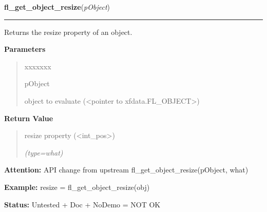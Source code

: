 \hspace{.8\funcindent}\begin{boxedminipage}{\funcwidth}

    \raggedright \textbf{fl\_get\_object\_resize}(\textit{pObject})

    \vspace{-1.5ex}

    \rule{\textwidth}{0.5\fboxrule}
\setlength{\parskip}{2ex}
    Returns the resize property of an object.

\setlength{\parskip}{1ex}
      \textbf{Parameters}
      \vspace{-1ex}

      \begin{quote}
        \begin{Ventry}{xxxxxxx}

          \item[pObject]

          object to evaluate ({\textless}pointer to 
          xfdata.FL\_OBJECT{\textgreater})

        \end{Ventry}

      \end{quote}

      \textbf{Return Value}
    \vspace{-1ex}

      \begin{quote}
      resize property ({\textless}int\_pos{\textgreater})

      {\it (type=what)}

      \end{quote}

\textbf{Attention:} API change from upstream fl\_get\_object\_resize(pObject, what)



\textbf{Example:} resize = fl\_get\_object\_resize(obj)



\textbf{Status:} Untested + Doc + NoDemo = NOT OK



    \end{boxedminipage}

    \label{xformslib:library:fl_set_object_gravity}

    \vspace{0.5ex}

